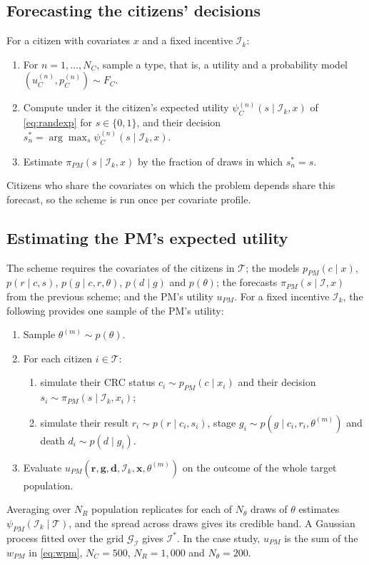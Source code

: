 \documentclass[12pt]{article}
\begin{document}
\subsection{Forecasting the citizens' decisions}\label{app:simulation_public_forecast}
For a citizen with covariates $x$ and a fixed incentive $\mathcal{I}_k$:
\begin{enumerate}
  \item For $n = 1, \dots, N_C$, sample a type, that is, a utility and a probability model $(u_C^{(n)}, p_C^{(n)}) \sim F_C$.
  \item Compute under it the citizen's expected utility $\psi_C^{(n)}(s \mid \mathcal{I}_k, x)$ of \eqref{eq:randexp} for $s \in \{0, 1\}$, and their decision $s_n^* = \arg\max_s \psi_C^{(n)}(s \mid \mathcal{I}_k, x)$.
  \item Estimate $\pi_{PM}(s \mid \mathcal{I}_k, x)$ by the fraction of draws in which $s_n^* = s$.
\end{enumerate}
Citizens who share the covariates on which the problem depends share this forecast, so the scheme is run once per covariate profile.

\subsection{Estimating the PM's expected utility}\label{app:simulation_public_utility}
The scheme requires the covariates of the citizens in $\mathcal{T}$; the models $p_{PM}(c \mid x)$, $p(r \mid c, s)$, $p(g \mid c, r, \theta)$, $p(d \mid g)$ and $p(\theta)$; the forecasts $\pi_{PM}(s \mid \mathcal{I}, x)$ from the previous scheme; and the PM's utility $u_{PM}$. For a fixed incentive $\mathcal{I}_k$, the following provides one sample of the PM's utility:
\begin{enumerate}
  \item Sample $\theta^{(m)} \sim p(\theta)$.
  \item For each citizen $i \in \mathcal{T}$:
  \begin{enumerate}
    \item simulate their CRC status $c_i \sim p_{PM}(c \mid x_i)$ and their decision $s_i \sim \pi_{PM}(s \mid \mathcal{I}_k, x_i)$;
    \item simulate their result $r_i \sim p(r \mid c_i, s_i)$, stage $g_i \sim p(g \mid c_i, r_i, \theta^{(m)})$ and death $d_i \sim p(d \mid g_i)$.
  \end{enumerate}
  \item Evaluate $u_{PM}(\mathbf{r}, \mathbf{g}, \mathbf{d}, \mathcal{I}_k, \mathbf{x}, \theta^{(m)})$ on the outcome of the whole target population.
\end{enumerate}
Averaging over $N_R$ population replicates for each of $N_\theta$ draws of $\theta$ estimates $\psi_{PM}(\mathcal{I}_k \mid \mathcal{T})$, and the spread across draws gives its credible band. A Gaussian process fitted over the grid $\mathcal{G}_{\mathcal{I}}$ gives $\mathcal{I}^*$. In the case study, $u_{PM}$ is the sum of the $w_{PM}$ in \eqref{eq:wpm}, $N_C = 500$, $N_R = 1{,}000$ and $N_\theta = 200$.
\end{document}
